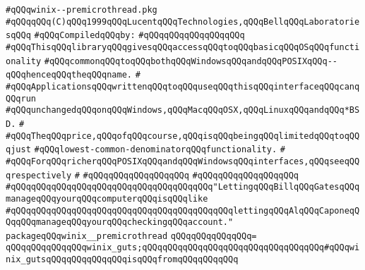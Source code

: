\label{src/lib/std/winix--premicrothread.pkg}
\verb|#qQQqwinix--premicrothread.pkg|\newline
\verb|#qQQqqQQq(C)qQQq1999qQQqLucentqQQqTechnologies,qQQqBellqQQqLaboratoriesqQQq|\newline
\newline
\verb|#qQQqCompiledqQQqby:|\newline
\verb|#qQQqqQQqqQQqqQQqqQQq|\newline
\newline
\verb|#qQQqThisqQQqlibraryqQQqgivesqQQqaccessqQQqtoqQQqbasicqQQqOSqQQqfunctionality|\newline
\verb|#qQQqcommonqQQqtoqQQqbothqQQqWindowsqQQqandqQQqPOSIXqQQq--qQQqhenceqQQqtheqQQqname.|\newline
\verb|#|\newline
\verb|#qQQqApplicationsqQQqwrittenqQQqtoqQQquseqQQqthisqQQqinterfaceqQQqcanqQQqrun|\newline
\verb|#qQQqunchangedqQQqonqQQqWindows,qQQqMacqQQqOSX,qQQqLinuxqQQqandqQQq*BSD.|\newline
\verb|#|\newline
\verb|#qQQqTheqQQqprice,qQQqofqQQqcourse,qQQqisqQQqbeingqQQqlimitedqQQqtoqQQqjust|\newline
\verb|#qQQqlowest-common-denominatorqQQqfunctionality.|\newline
\verb|#|\newline
\verb|#qQQqForqQQqricherqQQqPOSIXqQQqandqQQqWindowsqQQqinterfaces,qQQqseeqQQqrespectively|\newline
\verb|#|\newline
\verb|#qQQqqQQqqQQqqQQqqQQq|\newline
\verb|#qQQqqQQqqQQqqQQqqQQq|\newline
\newline
\newline
\newline
\verb|#qQQqqQQqqQQqqQQqqQQqqQQqqQQqqQQqqQQqqQQq"LettingqQQqBillqQQqGatesqQQqmanageqQQqyourqQQqcomputerqQQqisqQQqlike|\newline
\verb|#qQQqqQQqqQQqqQQqqQQqqQQqqQQqqQQqqQQqqQQqqQQqlettingqQQqAlqQQqCaponeqQQqqQQqmanageqQQqyourqQQqcheckingqQQqaccount."|\newline
\newline
\newline
\newline
\verb|packageqQQqwinix__premicrothread|\newline
\verb|qQQqqQQqqQQqqQQq=|\newline
\verb|qQQqqQQqqQQqqQQqwinix_guts;qQQqqQQqqQQqqQQqqQQqqQQqqQQqqQQqqQQq#qQQqwinix_gutsqQQqqQQqqQQqqQQqisqQQqfromqQQqqQQqqQQq|\newline
\newline

